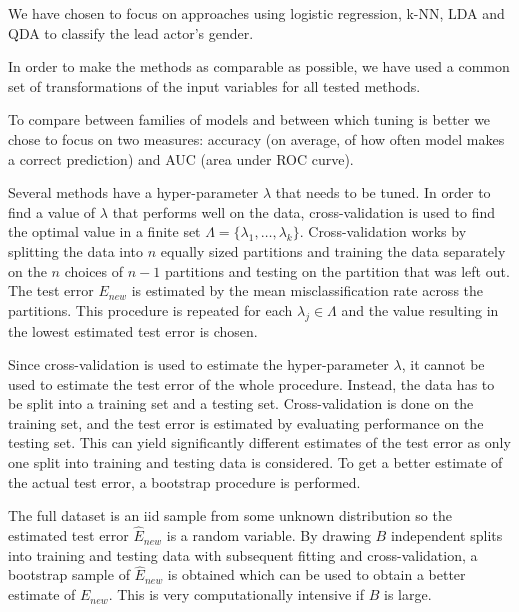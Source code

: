 \documentclass[../../project.tex]{subfiles}
\begin{document}
	We have chosen to focus on approaches using logistic regression, k-NN, LDA and QDA to classify the lead actor's gender.
	
	In order to make the methods as comparable as possible, we have used a common set of transformations of the input variables for all tested methods.
	
	To compare between families of models and between which tuning is better we chose to focus on two measures: accuracy (on average, of how often model makes a correct prediction) and AUC (area under ROC curve).
	
	Several methods have a  hyper-parameter $\lambda$ that needs to be tuned. In order to find a value of $\lambda$ that performs well on the data, cross-validation is used to find the optimal value in a finite set $\Lambda = \{ \lambda_1,\dots,\lambda_k \}$. Cross-validation works by splitting the data into $n$ equally sized partitions and training the data separately on the $n$ choices of $n-1$ partitions and testing on the partition that was left out. The test error $E_{new}$ is estimated by the mean misclassification rate across the partitions. This procedure is repeated for each $\lambda_j \in \Lambda$ and the value resulting in the lowest estimated test error is chosen.
	
	Since cross-validation is used to estimate the hyper-parameter $\lambda$, it cannot be used to estimate the test error of the whole procedure. Instead, the data has to be split into a training set and a testing set. Cross-validation is done on the training set, and the test error is estimated by evaluating performance on the testing set. This can yield significantly different estimates of the test error as only one split into training and testing data is considered. To get a better estimate of the actual test error, a bootstrap procedure is performed.
	
	The full dataset is an iid sample from some unknown distribution so the estimated test error $\hat E_{new}$ is a random variable. By drawing $B$ independent splits into training and testing data with subsequent fitting and cross-validation, a bootstrap sample of $\hat E_{new}$ is obtained which can be used to obtain a better estimate of $E_{new}$. This is very computationally intensive if $B$ is large.
\end{document}
